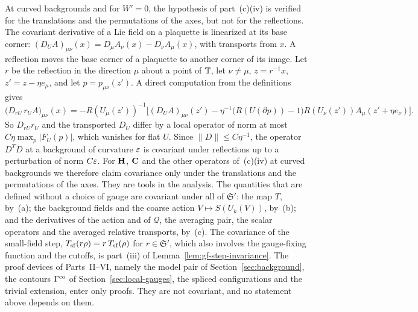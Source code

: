 \begin{remark}\label{rem:symmetry-reflections}
At curved backgrounds and for $W'=0$, the hypothesis of part~(c)(iv) is verified for the translations and the permutations of the axes, but not for the reflections. The covariant derivative of a Lie field on a plaquette is linearized at its base corner: $(D_UA)_{\mu\nu}(x)=D_\mu A_\nu(x)-D_\nu A_\mu(x)$, with transports from $x$. A reflection moves the base corner of a plaquette to another corner of its image. Let $r$ be the reflection in the direction $\mu$ about a point of $\mathbb T$, let $\nu\ne\mu$, $z=r^{-1}x$, $z'=z-\eta e_\mu$, and let $p=p_{\mu\nu}(z')$. A direct computation from the definitions gives
\[
\big(D_{rU}\,r_UA\big)_{\mu\nu}(x)=-R(U_\mu(z'))^{-1}\Big[(D_UA)_{\mu\nu}(z')-\eta^{-1}\big(R(U(\partial p))-1\big)R(U_\nu(z'))A_\mu(z'+\eta e_\nu)\Big].
\]
So $D_{rU}r_U$ and the transported $D_U$ differ by a local operator of norm at most $C\eta\max_p|F_U(p)|$, which vanishes for flat $U$. Since $\|D\|\le C\eta^{-1}$, the operator $D^TD$ at a background of curvature $\varepsilon$ is covariant under reflections up to a perturbation of norm $C\varepsilon$. For $\mathbf H$, $\mathbf C$ and the other operators of~(c)(iv) at curved backgrounds we therefore claim covariance only under the translations and the permutations of the axes. They are tools in the analysis. The quantities that are defined without a choice of gauge are covariant under all of $\mathfrak S'$: the map $T$, by~(a); the background fields and the coarse action $V\mapsto S(U_k(V))$, by~(b); and the derivatives of the action and of $\mathcal Q$, the averaging pair, the scalar operators and the averaged relative transports, by~(c). The covariance of the small-field step, $T_{\rm sf}(r\rho)=r\,T_{\rm sf}(\rho)$ for $r\in\mathfrak S'$, which also involves the gauge-fixing function and the cutoffs, is part~(iii) of Lemma~\ref{lem:gf-step-invariance}. The proof devices of Parts~II--VI, namely the model pair of Section~\ref{sec:background}, the contours $\Gamma^{\rm co}$ of Section~\ref{sec:local-gauges}, the spliced configurations and the trivial extension, enter only proofs. They are not covariant, and no statement above depends on them.
\end{remark}
